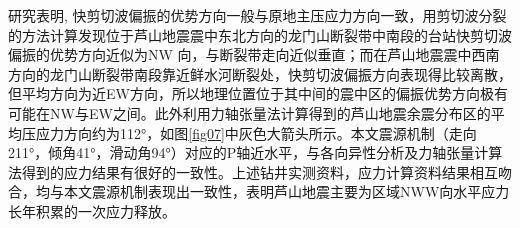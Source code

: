 研究表明, 快剪切波偏振的优势方向一般与原地主压应力方向一致\citep{高原2008,Gao2011,Gao2012}，\citet{高原2013}用剪切波分裂的方法计算发现位于芦山地震震中东北方向的龙门山断裂带中南段的台站快剪切波偏振的优势方向近似为NW 向，与断裂带走向近似垂直；而在芦山地震震中西南方向的龙门山断裂带南段靠近鲜水河断裂处，快剪切波偏振方向表现得比较离散，但平均方向为近EW方向，所以地理位置位于其中间的震中区的偏振优势方向极有可能在NW与EW之间。此外\citet{赵博2013}利用力轴张量法计算得到的芦山地震余震分布区的平均压应力方向约为112°，如图\ref{fig07}中灰色大箭头所示。本文震源机制（走向211°，倾角41°，滑动角94°）对应的P轴近水平，与各向异性分析及力轴张量计算法得到的应力结果有很好的一致性。上述钻井实测资料，应力计算资料结果相互吻合，均与本文震源机制表现出一致性，表明芦山地震主要为区域NWW向水平应力长年积累的一次应力释放。

